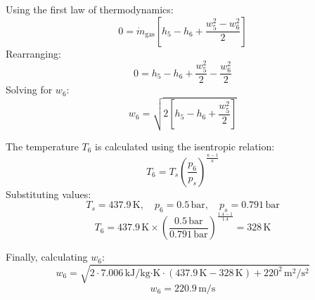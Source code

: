 Using the first law of thermodynamics:  
\[
0 = \dot{m}_{\text{gas}} \left[ h_5 - h_6 + \frac{w_5^2 - w_6^2}{2} \right]
\]  
Rearranging:  
\[
0 = h_5 - h_6 + \frac{w_5^2}{2} - \frac{w_6^2}{2}
\]  
Solving for \( w_6 \):  
\[
w_6 = \sqrt{2 \left[ h_5 - h_6 + \frac{w_5^2}{2} \right]}
\]  

The temperature \( T_6 \) is calculated using the isentropic relation:  
\[
T_6 = T_s \left( \frac{p_6}{p_s} \right)^{\frac{\kappa - 1}{\kappa}}
\]  
Substituting values:  
\[
T_s = 437.9 \, \text{K}, \quad p_6 = 0.5 \, \text{bar}, \quad p_s = 0.791 \, \text{bar}
\]  
\[
T_6 = 437.9 \, \text{K} \times \left( \frac{0.5 \, \text{bar}}{0.791 \, \text{bar}} \right)^{\frac{1.4 - 1}{1.4}} = 328 \, \text{K}
\]  

Finally, calculating \( w_6 \):  
\[
w_6 = \sqrt{2 \cdot 7.006 \, \text{kJ}/\text{kg·K} \cdot (437.9 \, \text{K} - 328 \, \text{K}) + 220^2 \, \text{m}^2/\text{s}^2}
\]  
\[
w_6 = 220.9 \, \text{m/s}
\]